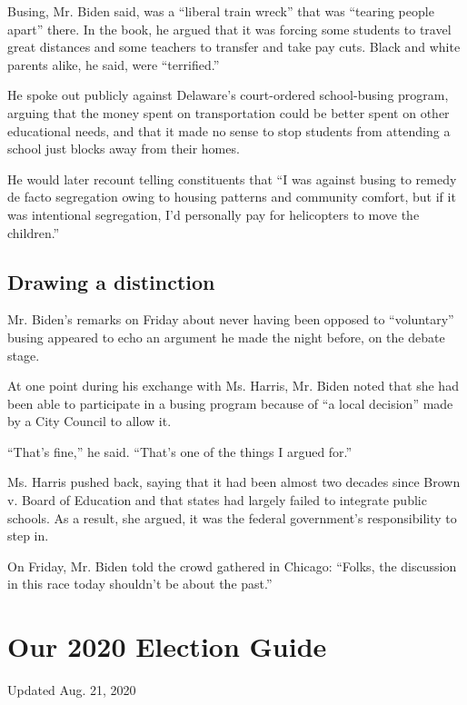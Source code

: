 Busing, Mr. Biden said, was a ``liberal train wreck'' that was ``tearing
people apart'' there. In the book, he argued that it was forcing some
students to travel great distances and some teachers to transfer and
take pay cuts. Black and white parents alike, he said, were
``terrified.''

He spoke out publicly against Delaware's court-ordered school-busing
program, arguing that the money spent on transportation could be better
spent on other educational needs, and that it made no sense to stop
students from attending a school just blocks away from their homes.

He would later recount telling constituents that ``I was against busing
to remedy de facto segregation owing to housing patterns and community
comfort, but if it was intentional segregation, I'd personally pay for
helicopters to move the children.''

\hypertarget{drawing-a-distinction}{%
\subsection{Drawing a distinction}\label{drawing-a-distinction}}

Mr. Biden's remarks on Friday about never having been opposed to
``voluntary'' busing appeared to echo an argument he made the night
before, on the debate stage.

At one point during his exchange with Ms. Harris, Mr. Biden noted that
she had been able to participate in a busing program because of ``a
local decision'' made by a City Council to allow it.

``That's fine,'' he said. ``That's one of the things I argued for.''

Ms. Harris pushed back, saying that it had been almost two decades since
Brown v. Board of Education and that states had largely failed to
integrate public schools. As a result, she argued, it was the federal
government's responsibility to step in.

On Friday, Mr. Biden told the crowd gathered in Chicago: ``Folks, the
discussion in this race today shouldn't be about the past.''

\hypertarget{our-2020-election-guide}{%
\section{Our 2020 Election Guide}\label{our-2020-election-guide}}

Updated Aug. 21, 2020

